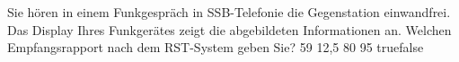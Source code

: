     {Sie hören in einem Funkgespräch in SSB-Telefonie die Gegenstation einwandfrei. Das Display Ihres Funkgerätes zeigt die abgebildeten Informationen an. Welchen Empfangsrapport nach dem RST-System geben Sie?}
    {59}
    {12,5}
    {80}
    {95}
    {true}{false}
